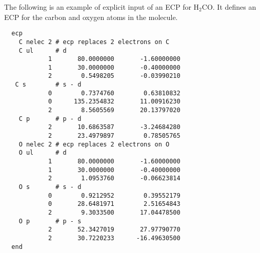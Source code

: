 The following is an example of explicit input of an ECP for H$_2$CO.
It defines an ECP for the carbon and oxygen atoms in the molecule.


\begin{verbatim}
  ecp
    C nelec 2 # ecp replaces 2 electrons on C
    C ul      # d
            1       80.0000000       -1.60000000
            1       30.0000000       -0.40000000
            2        0.5498205       -0.03990210
   C s        # s - d 
            0        0.7374760        0.63810832
            0      135.2354832       11.00916230
            2        8.5605569       20.13797020
    C p       # p - d
            2       10.6863587       -3.24684280
            2       23.4979897        0.78505765
    O nelec 2 # ecp replaces 2 electrons on O
    O ul      # d 
            1       80.0000000       -1.60000000
            1       30.0000000       -0.40000000
            2        1.0953760       -0.06623814
    O s       # s - d
            0        0.9212952        0.39552179
            0       28.6481971        2.51654843
            2        9.3033500       17.04478500
    O p       # p - s 
            2       52.3427019       27.97790770
            2       30.7220233      -16.49630500
  end
\end{verbatim}


